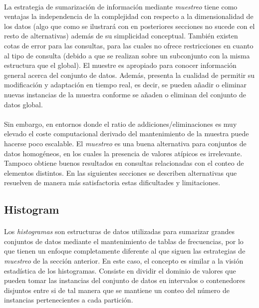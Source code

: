 \documentclass{subfiles}
\begin{document}
        \paragraph{}
        La estrategia de sumarización de información mediante \emph{muestreo} tiene como ventajas la independencia de la complejidad con respecto a la dimensionalidad de los datos (algo que como se ilustrará con en posteriores secciones no sucede con el resto de alternativas) además de su simplicidad conceptual. También existen cotas de error para las consultas, para las cuales no ofrece restricciones en cuanto al tipo de consulta (debido a que se realizan sobre un subconjunto con la misma estructura que el global). El muestre es apropiado para conocer información general acerca del conjunto de datos. Además, presenta la cualidad de permitir su modificación y adaptación en tiempo real, es decir, se pueden añadir o eliminar nuevas instancias de la muestra conforme se añaden o eliminan del conjunto de datos global.

        \paragraph{}
        Sin embargo, en entornos donde el ratio de addiciones/eliminaciones es muy elevado el coste computacional derivado del mantenimiento de la muestra puede hacerse poco escalable. El \emph{muestreo} es una buena alternativa para conjuntos de datos homogéneos, en los cuales la presencia de valores atípicos es irrelevante. Tampoco obtiene buenos resultados en consultas relacionadas con el conteo de elementos distintos. En las siguientes secciones se describen alternativas que resuelven de manera más satisfactoria estas dificultades y limitaciones.

      \subsection{Histogram}
      \label{sec:histogram}

        \paragraph{}
        Los \emph{histogramas} son estructuras de datos utilizadas para sumarizar grandes conjuntos de datos mediante el mantenimiento de tablas de frecuencias, por lo que tienen un enfoque completamente diferente al que siguen las estrategias de \emph{muestreo} de la sección anterior. En este caso, el concepto es similar a la visión estadística de los histogramas. Consiste en dividir el dominio de valores que pueden tomar las instancias del conjunto de datos en intervalos o contenedores disjuntos entre si de tal manera que se mantiene un conteo del número de instancias pertenecientes a cada partición.
\end{document}
